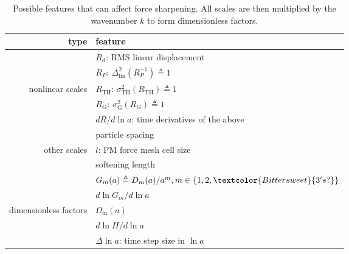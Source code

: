\documentclass[modern, trackchanges, dvipsnames]{aastex631}
\renewcommand{\d}{d}
\newcommand{\lna}{\ln\!a}
\newcommand{\Omegam}{\Omega_\mathrm{m}}
\newcommand{\linear}{\mathrm{lin}}
\newcommand{\tophat}{\mathrm{TH}}
\newcommand{\gauss}{\mathrm{G}}
\newcommand{\YL}[1]{\textcolor{Bittersweet}{#1}}
\begin{document}
\begin{table}
  \centering
  \caption{Possible features that can affect force sharpening.
  All scales are then multiplied by the wavenumber $k$ to form dimensionless
  factors.}
  \label{tab:feat}
  \begin{tabular}{rl}
  \toprule
  type & feature \\
  \midrule
  & $R_\mathrm{d}$: RMS linear displacement \\
  \cmidrule(lr){2-2}
  & $R_P$: $\Delta_\linear^2(R_P^{-1}) \triangleq 1$ \\
  \cmidrule(lr){2-2}
  nonlinear scales & $R_\tophat$: $\sigma_\tophat^2(R_\tophat) \triangleq 1$ \\
  \cmidrule(lr){2-2}
  & $R_\gauss$: $\sigma_\gauss^2(R_\gauss) \triangleq 1$ \\
  \cmidrule(lr){2-2}
  & $\d R / \d\lna$: time derivatives of the above \\
  \midrule
  & particle spacing \\
  \cmidrule(lr){2-2}
  other scales & $l$: PM force mesh cell size \\
  \cmidrule(lr){2-2}
  & softening length \\
  \midrule
  & $G_m(a) \triangleq D_m(a) / a^m, m \in \{1, 2, \YL{3's?}\}$ \\
  \cmidrule(lr){2-2}
  & $\d\ln G_m / \d\lna$ \\
  \cmidrule(lr){2-2}
  dimensionless factors & $\Omegam(a)$ \\
  \cmidrule(lr){2-2}
  & $\d\ln\!H / \d\lna$ \\
  \cmidrule(lr){2-2}
  & $\Delta\lna$: time step size in $\lna$ \\
  \bottomrule
  \end{tabular}
  \end{table}
\end{document}
